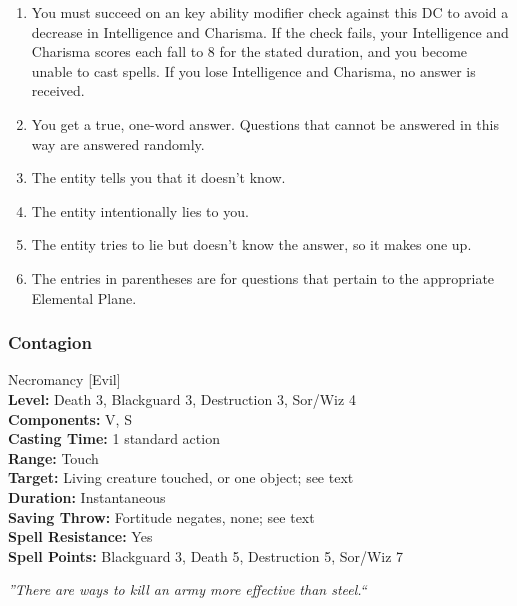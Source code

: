 \begin{table}
{\begin{tabular*}{\textwidth}{@{\extracolsep{\fill}}|llllll|}
\end{tabular*}}
\begin{enumerate}
 \small
 \item You must succeed on an key ability modifier check against this DC to avoid a decrease in Intelligence and Charisma. 
If the check fails, your Intelligence and Charisma scores each fall to 8 for the stated duration, 
and you become unable to cast spells. If you lose Intelligence and Charisma, no answer is received.
 \item You get a true, one-word answer. Questions that cannot be answered in this way are answered randomly.
 \item The entity tells you that it doesn't know.
 \item The entity intentionally lies to you.
 \item The entity tries to lie but doesn't know the answer, so it makes one up.
 \item The entries in parentheses are for questions that pertain to the appropriate Elemental Plane.
\end{enumerate}

\end{table}

\subsubsection{Contagion}
\label{Spell:Contagion}
Necromancy [Evil]
\\ \textbf{Level:} Death 3, Blackguard 3, Destruction 3, Sor/Wiz 4
\\ \textbf{Components:} V, S
\\ \textbf{Casting Time:} 1 standard action
\\ \textbf{Range:} Touch
\\ \textbf{Target:} Living creature touched, or one object; see text
\\ \textbf{Duration:} Instantaneous
\\ \textbf{Saving Throw:} Fortitude negates, none; see text
\\ \textbf{Spell Resistance:} Yes
\\ \textbf{Spell Points:} Blackguard 3, Death 5, Destruction 5, Sor/Wiz 7

\emph{''There are ways to kill an army more effective than steel.``}

